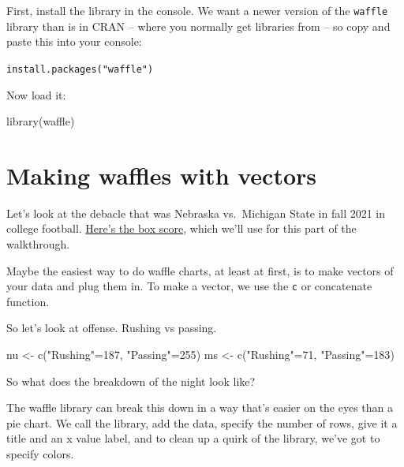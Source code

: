 \documentclass[
  letterpaper,
  DIV=11,
  numbers=noendperiod]{scrreprt}
\newenvironment{Shaded}{\begin{snugshade}}{\end{snugshade}}
\newcommand{\DecValTok}[1]{\textcolor[rgb]{0.68,0.00,0.00}{#1}}
\newcommand{\FunctionTok}[1]{\textcolor[rgb]{0.28,0.35,0.67}{#1}}
\newcommand{\NormalTok}[1]{\textcolor[rgb]{0.00,0.23,0.31}{#1}}
\newcommand{\OtherTok}[1]{\textcolor[rgb]{0.00,0.23,0.31}{#1}}
\newcommand{\StringTok}[1]{\textcolor[rgb]{0.13,0.47,0.30}{#1}}
\begin{document}
First, install the library in the console. We want a newer version of
the \texttt{waffle} library than is in CRAN -- where you normally get
libraries from -- so copy and paste this into your console:

\texttt{install.packages("waffle")}

Now load it:

\begin{Shaded}
\begin{Highlighting}[]
\FunctionTok{library}\NormalTok{(waffle)}
\end{Highlighting}
\end{Shaded}

\hypertarget{making-waffles-with-vectors}{%
\section{Making waffles with
vectors}\label{making-waffles-with-vectors}}

Let's look at the debacle that was Nebraska vs.~Michigan State in fall
2021 in college football.
\href{https://www.espn.com/college-football/matchup?gameId=401282784}{Here's
the box score}, which we'll use for this part of the walkthrough.

Maybe the easiest way to do waffle charts, at least at first, is to make
vectors of your data and plug them in. To make a vector, we use the
\texttt{c} or concatenate function.

So let's look at offense. Rushing vs passing.

\begin{Shaded}
\begin{Highlighting}[]
\NormalTok{nu }\OtherTok{\textless{}{-}} \FunctionTok{c}\NormalTok{(}\StringTok{"Rushing"}\OtherTok{=}\DecValTok{187}\NormalTok{, }\StringTok{"Passing"}\OtherTok{=}\DecValTok{255}\NormalTok{)}
\NormalTok{ms }\OtherTok{\textless{}{-}} \FunctionTok{c}\NormalTok{(}\StringTok{"Rushing"}\OtherTok{=}\DecValTok{71}\NormalTok{, }\StringTok{"Passing"}\OtherTok{=}\DecValTok{183}\NormalTok{)}
\end{Highlighting}
\end{Shaded}

So what does the breakdown of the night look like?

The waffle library can break this down in a way that's easier on the
eyes than a pie chart. We call the library, add the data, specify the
number of rows, give it a title and an x value label, and to clean up a
quirk of the library, we've got to specify colors.
\end{document}
